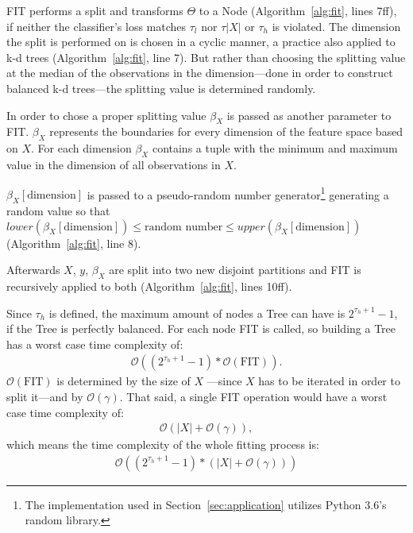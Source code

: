 FIT performs a split and transforms $\Theta$ to a Node
(Algorithm~\ref{alg:fit}, lines 7ff), if neither the
classifier's loss matches $\tau_l$ nor $\tau{|X|}$ or
$\tau_h$ is violated. The dimension the split is performed
on is chosen in a cyclic manner, a practice also applied to
k-d trees (Algorithm~\ref{alg:fit}, line 7).%
\cite{Brown2015kdtree}
But rather than choosing the splitting value at the median
of the observations in the dimension---done in order to
construct balanced k-d trees---the splitting value
is determined randomly.\cite{Brown2015kdtree}

In order to chose a proper splitting value $\beta_X$ is
passed as another parameter to FIT. $\beta_X$ represents
the boundaries for every dimension of the feature space
based on $X$. For each dimension $\beta_X$ contains a
tuple with the minimum and maximum value in the dimension
of all observations in $X$.

$\beta_X[\text{dimension}]$ is passed to a pseudo-random
number generator\footnote{The implementation used in
  Section~\ref{sec:application} utilizes Python 3.6's
  random library.\cite[chapter 9.6]{python}}
generating a random value so that
$lower(\beta_X[\text{dimension}]) \leq \text{random number}
\leq upper(\beta_X[\text{dimension}])$
(Algorithm~\ref{alg:fit}, line 8).

Afterwards $X$, $y$, $\beta_X$ are split into two new
disjoint partitions and FIT is recursively applied to both
(Algorithm~\ref{alg:fit}, lines 10ff).

Since $\tau_h$ is defined, the maximum amount of nodes a
Tree can have is $2^{\tau_h + 1} - 1$, if the Tree is
perfectly balanced.\cite[chapter 16.1]{Teschl} For each
node FIT is called, so building a Tree has a worst case
time complexity of:
\begin{align}
  \mathcal{O}((2^{\tau_h + 1} -1)*\mathcal{O}(\text{FIT})).
\end{align}
$\mathcal{O}(\text{FIT})$ is determined by the size of $X$%
---since $X$ has to be iterated in order to split it---and
by $\mathcal{O}(\gamma)$. That said, a single FIT
operation would have a worst case time complexity of:
\begin{align}
  \mathcal{O}(|X| + \mathcal{O}(\gamma)),
\end{align} which means the time complexity of the whole
fitting process is:
\begin{align}
  \mathcal{O}((2^{\tau_h + 1} - 1) *
  (|X| + \mathcal{O}(\gamma)))
\label{eq:O_fit}
\end{align}

